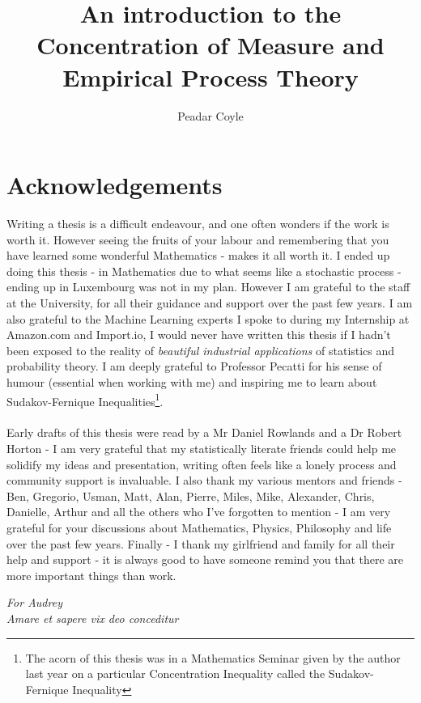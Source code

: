 \documentclass[12pt, oneside, a4paper]{article}
\title{An introduction to the Concentration of Measure and Empirical Process Theory}
\author{Peadar Coyle}
\theoremstyle{plain}
\theoremstyle{definition}
\begin{document}
\renewcommand{\baselinestretch}{1.5}

\maketitle
\tableofcontents
\listoffigures
\newpage
\section{Acknowledgements}
Writing a thesis is a difficult endeavour, and one often wonders if the work is worth it. 
However seeing the fruits of your labour and remembering that you have learned some wonderful Mathematics - makes it all 
worth it. I ended up doing this thesis - in Mathematics due to what seems like a stochastic process - ending up in Luxembourg
was not in my plan. However I am grateful to the staff at the University, for all their guidance and support over the past few years.
I am also grateful to the Machine Learning experts I spoke to during my Internship at Amazon.com and Import.io, I would never
have written this thesis if I hadn't been exposed to the reality of \textit{beautiful industrial applications} of statistics and
probability theory. I am deeply grateful to Professor Pecatti for his sense of humour (essential when working with me) 
and inspiring me to learn about Sudakov-Fernique Inequalities\footnote{The acorn of this thesis was in a Mathematics
Seminar given by the author last year on a particular Concentration Inequality called the Sudakov-Fernique Inequality\cite{Chatterjee2005}}.
\paragraph{} Early drafts of this thesis were read by a Mr Daniel Rowlands and a Dr Robert Horton - I am very grateful
that my statistically literate friends could help me solidify my ideas and presentation, writing often feels like a lonely
process and community support is invaluable. I also thank my various mentors and friends - Ben, Gregorio, Usman, Matt,
Alan, Pierre, Miles, Mike, Alexander, Chris, Danielle, Arthur and all the others who I've forgotten to mention - I am very grateful for 
your discussions about Mathematics, Physics, Philosophy and life over the past few years.
Finally - I thank my girlfriend and family for all their help and support - it is always good to have someone remind you that there are
more important things than work. 
\newpage

\begin{center}
 \textit{For Audrey}
\\
\textit{Amare et sapere vix deo conceditur}
\end{center}
\end{document}

